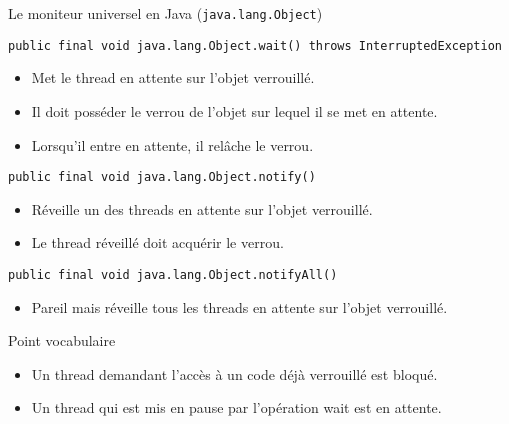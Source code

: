 
\begingroup

\begin{frame}[fragile]{Le moniteur universel en Java (\lstinline|java.lang.Object|)}

  \vfill    
  \begin{block}{\lstinline|public final void java.lang.Object.wait() throws InterruptedException|}
    \begin{itemize}
    \item Met le thread en attente sur l'objet verrouillé.
    \item Il doit \alert{posséder} le verrou de l'objet sur lequel il se met en attente.
    \item Lorsqu'il entre en attente, il \alert{relâche}  le verrou.
    \end{itemize}
  \end{block}

  \vfill    
  \begin{block}{\lstinline|public final void java.lang.Object.notify()|}
    \begin{itemize}
    \item Réveille un des threads en attente sur l'objet verrouillé.
    \item Le thread réveillé doit \alert{acquérir} le verrou.
    \end{itemize}
  \end{block}

  \vfill    
  \begin{block}{\lstinline|public final void java.lang.Object.notifyAll()|}
    \begin{itemize}
    \item Pareil mais réveille tous les threads en attente sur l'objet verrouillé.
    \end{itemize}
  \end{block}
  \vfill
  \begin{alertblock}{Point vocabulaire}
    \begin{itemize}
    \item Un thread demandant l'accès à un code déjà verrouillé est \alert{bloqué}.
    \item Un  thread qui  est mis  en pause  par l'opération wait est \alert{en attente}.      
    \end{itemize}
  \end{alertblock}
  \vfill
\end{frame}

\endgroup
\endinput
